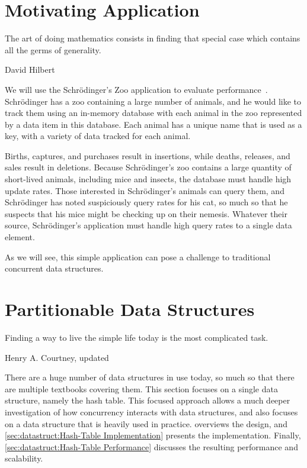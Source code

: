 \section{Motivating Application}
\label{sec:datastruct:Motivating Application}
%
\epigraph{The art of doing mathematics consists in finding that special
	  case which contains all the germs of generality.}
	 {David Hilbert}

We will use the Schr\"odinger's Zoo application to evaluate
performance~\cite{McKenney:2013:SDS:2483852.2483867}.
Schr\"odinger has a zoo containing a large number of animals, and
he would like to track them using an in-memory database with
each animal in the zoo represented by a data item in this database.
Each animal has a unique name that is used as a key, with a variety
of data tracked for each animal.

Births, captures, and purchases result in insertions, while deaths,
releases, and sales result in deletions.
Because Schr\"odinger's zoo contains a large quantity of short-lived
animals, including mice and insects, the database must handle
high update rates.
Those interested in Schr\"odinger's animals can query them, and
Schr\"odinger has noted suspiciously query rates for his cat, so much
so that he suspects that his mice might be checking up on their nemesis.
Whatever their source, Schr\"odinger's application must handle high
query rates to a single data element.

As we will see, this simple application can pose a challenge to
traditional concurrent data structures.

\section{Partitionable Data Structures}
\label{sec:datastruct:Partitionable Data Structures}
%
\epigraph{Finding a way to live the simple life today is the most
	  complicated task.}
	 {Henry A. Courtney, updated}

There are a huge number of data structures in use today, so much so
that there are multiple textbooks covering them.
This section focuses on a single data structure, namely the hash table.
This focused approach allows a much deeper investigation of how concurrency
interacts with data structures, and also focuses on a data structure
that is heavily used in practice.
overviews the design, and
\cref{sec:datastruct:Hash-Table Implementation}
presents the implementation.
Finally,
\cref{sec:datastruct:Hash-Table Performance}
discusses the resulting performance and scalability.

